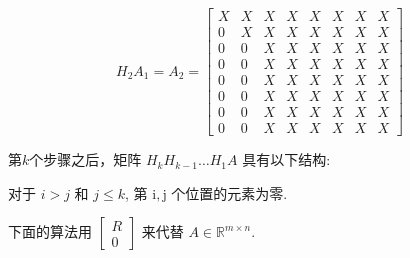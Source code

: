 $$H_2A_1= A_{2}=\left[\begin{array}{cccccccc}X & X & X & X & X & X & X & X \\ 0 & X & X & X & X & X & X & X \\ 0 & 0 & X & X & X & X & X & X \\ 0 & 0 & X & X & X & X & X & X \\ 0 & 0 & X & X & X & X & X & X \\ 0 & 0 & X & X & X & X & X & X \\ 0 & 0 & X & X & X & X & X & X \\ 0 & 0 & X & X & X & X & X & X\end{array}\right] $$

\begin{theorem}
    第$k$个步骤之后，矩阵 $ H_{k} H_{k-1} \ldots H_{1} A $ 具有以下结构:

对于 $ i>j $ 和 $ j \leq k $, 第 $ \mathrm{i}, \mathrm{j} $ 个位置的元素为零.
\end{theorem}


下面的算法用 $ \left[\begin{array}{l}R \\ 0\end{array}\right] $ 来代替 $ A \in \mathbb{R}^{m \times n} $.


